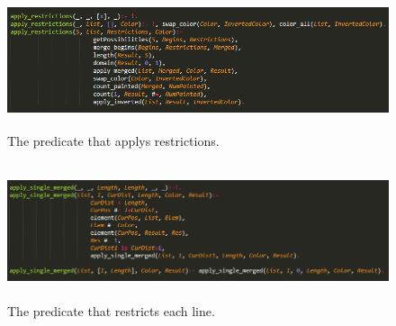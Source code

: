 \documentclass[runningheads,a4paper]{llncs}
\begin{document}
	\begin{figure}[h!]
	\centering
	\includegraphics[height=4.0cm]{applyRestrictions.png}
	\caption{The predicate that applys restrictions.}
	\label{applyRest}
	\end{figure}

	\begin{figure}[h!]
	\centering
	\includegraphics[height=4.0cm]{applySingle.png}
	\caption{The predicate that restricts each line.}
	\label{applySingle}
	\end{figure}
\end{document}
